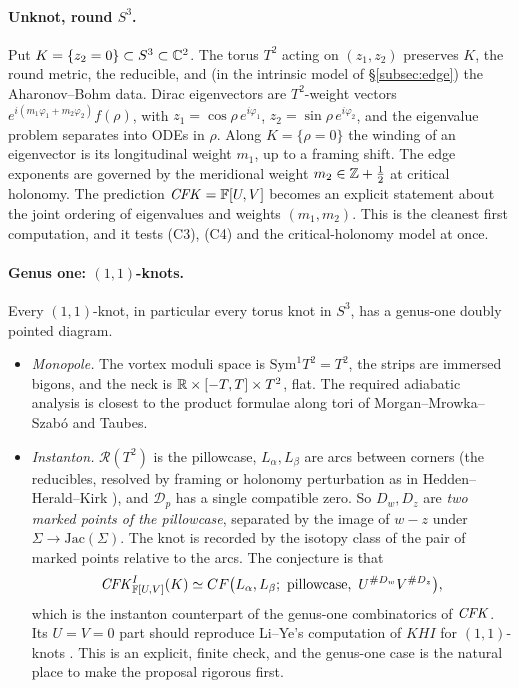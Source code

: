 \paragraph{Unknot, round $S^3$.}  Put $K=\{z_2=0\}\subset S^3\subset\mathbb{C}^2$.  The torus $T^2$ acting on $(z_1,z_2)$ preserves $K$, the round
metric, the reducible, and (in the intrinsic model of \S\ref{subsec:edge}) the Aharonov--Bohm data.  Dirac eigenvectors
are $T^2$-weight vectors $e^{i(m_1\varphi_1+m_2\varphi_2)}f(\rho)$, with $z_1=\cos\rho\,e^{i\varphi_1}$, $z_2=\sin\rho\,e^{i\varphi_2}$, and the
eigenvalue problem separates into ODEs in $\rho$.  Along $K=\{\rho=0\}$ the winding of an eigenvector is its longitudinal
weight $m_1$, up to a framing shift.  The edge exponents are governed by the meridional weight $m_2\in\mathbb{Z}+\tfrac12$ at critical
holonomy.  The prediction $\mathit{CFK}=\mathbb{F}[U,V]$ becomes an explicit statement about the joint ordering of eigenvalues and
weights $(m_1,m_2)$.  This is the cleanest first computation, and it tests (C3), (C4) and the critical-holonomy
model at once.

\paragraph{Genus one: $(1,1)$-knots.}  Every $(1,1)$-knot, in particular every torus knot in $S^3$, has a genus-one doubly
pointed diagram.
\begin{itemize}[leftmargin=2em]
\item \emph{Monopole.}  The vortex moduli space is $\mathrm{Sym}^1T^2=T^2$, the strips are immersed bigons, and the neck is
$\mathbb{R}\times[-T,T]\times T^2$, flat.  The required adiabatic analysis is closest to the product formulae along tori of
Morgan--Mrowka--Szab\'o \cite{MMS} and Taubes.
\item \emph{Instanton.}  $\mathcal R(T^2)$ is the pillowcase, $L_\alpha,L_\beta$ are arcs between corners (the reducibles, resolved by
framing or holonomy perturbation as in Hedden--Herald--Kirk \cite{HHK1}), and $\mathcal D_p$ has a single compatible zero.  So
$D_w,D_z$ are \emph{two marked points of the pillowcase}, separated by the image of $w-z$ under $\Sigma\to\mathrm{Jac}(\Sigma)$.  The knot is
recorded by the isotopy class of the pair of marked points relative to the arcs.  The conjecture is that
\[
\CFK^{I}_{\F[U,V]}(K)\simeq CF\big(L_\alpha,L_\beta;\ \text{pillowcase},\ U^{\#D_w}V^{\#D_z}\big),
\]
which is the instanton counterpart of the genus-one combinatorics of $\mathit{CFK}$.  Its $U=V=0$ part should reproduce
Li--Ye's computation of $KHI$ for $(1,1)$-knots \cite{LY-heegaard}.  This is an explicit, finite check, and the genus-one
case is the natural place to make the proposal rigorous first.
\end{itemize}

